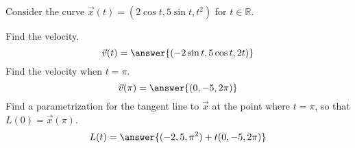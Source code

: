 \begin{problem}
Consider the curve $\vec{x}(t) = (2\cos t, 5\sin t, t^2)$ for $t\in\mathbb{R}$.

Find the velocity.
\[
\vec{v}(t) = \answer{(-2\sin t, 5\cos t, 2t)}
\]
Find the velocity when $t = \pi$.
\[
\vec{v}(\pi) = \answer{(0,-5,2\pi)}
\]
Find a parametrization for the tangent line to $\vec{x}$ at the point where $t = \pi$, so that $L(0) = \vec{x}(\pi)$.
\[
L(t) = \answer{(-2,5,\pi^2) + t(0,-5,2\pi)}
\]
\end{problem}